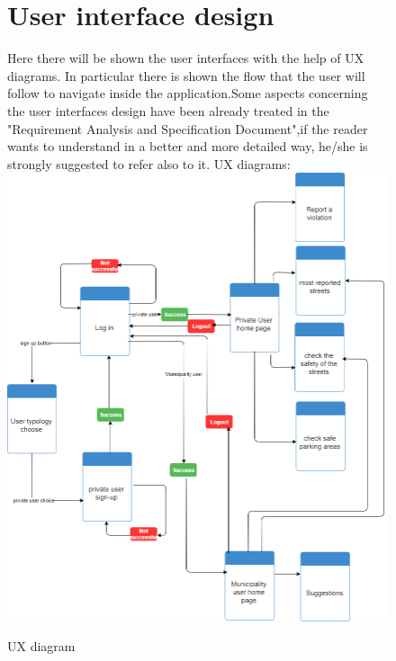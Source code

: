 \documentclass[titlepage]{article}
\begin{document}
\begin{figure}[h]
	\section{User interface design}
Here there will be shown the user interfaces with the help of UX diagrams. In particular there is shown the flow that the user will follow to navigate inside the application.Some aspects concerning the user interfaces design have been already treated in the "Requirement Analysis and Specification Document",if the reader wants to understand in a better and more detailed way, he/she is strongly suggested to refer also to it.
UX diagrams:\\
	\includegraphics[scale=0.48]{Diagrams/UX diagram.png}
	\caption{UX diagram}
\end{figure}
\FloatBarrier
\end{document}
